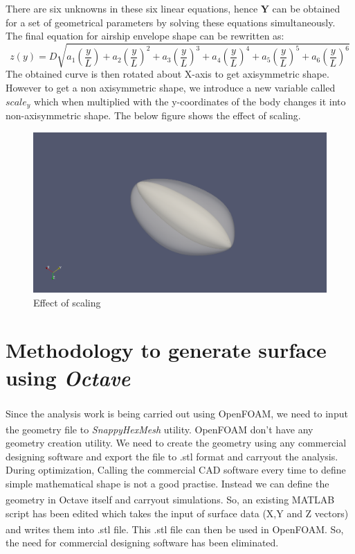 There are six unknowns in these six linear equations, hence $\bm{Y}$ can be obtained for a set of geometrical parameters by solving these equations simultaneously. The final equation for airship envelope shape can be rewritten as:
\begin{equation}
\label{eq28}
z(y) = D\sqrt{a_1\left(\dfrac{y}{L}\right) + a_2\left(\dfrac{y}{L}\right)^2 + a_3\left(\dfrac{y}{L}\right)^3 + a_4\left(\dfrac{y}{L}\right)^4 + a_5\left(\dfrac{y}{L}\right)^5 +  a_6\left(\dfrac{y}{L}\right)^6}	
\end{equation}
The obtained curve is then rotated about X-axis to get axisymmetric shape. However to get a non axisymmetric shape, we introduce a new variable called $ scale_y $ which when multiplied with the y-coordinates of the body changes it into non-axisymmetric shape. The below figure shows the effect of scaling.
\begin{figure}[htbp]
	\centering
	\includegraphics[width=200 pt]{rnd/effect_of_scaling.png}
	\caption{Effect of scaling }
	\label{Effect of scaling}
\end{figure}


\section{Methodology to generate surface using \textit{Octave}}

Since the analysis work is being carried out using OpenFOAM\textsuperscript{\textregistered}, we need to input the geometry file to \textit{SnappyHexMesh} utility. OpenFOAM\textsuperscript{\textregistered} don't have any geometry creation utility. We need to create the geometry using any commercial designing software and export the file to .stl format and carryout the analysis. During optimization, Calling the commercial CAD software every time to define simple mathematical shape is not a good practise. Instead we can define the geometry in Octave itself and carryout simulations. So, an existing MATLAB\textsuperscript{\textregistered} script has been edited which takes the input of surface data  (X,Y and Z vectors) and writes them into .stl file. This .stl file can then be used in OpenFOAM\textsuperscript{\textregistered}. So, the need for commercial designing software has been eliminated.
